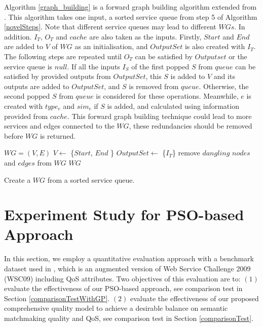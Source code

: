 Algorithm  \ref{graph_building} is a forward graph building algorithm extended from \cite{blum1997fast}. This algorithm takes one input, a sorted service queue from step 5 of Algorithm \ref{novelSteps}. Note that different service queues may lead to different $WGs$. In addition. $I_{T}$, $O_{T}$ and $cache$ are also taken as the inputs. Firstly, $Start$ and $End$ are added to $V$ of $WG$ as an initialisation, and $OutputSet$ is also created with $I_{T}$. The following steps are repeated until $O_{T}$ can be satisfied by $Outputset$ or the service queue is $null$. If all the inputs $I_{S}$ of the first popped  $S$ from $queue$ can be satisfied by provided outputs from $OutputSet$, this $S$ is added to $V$ and its outputs are added to $OutputSet$, and $S$ is removed from $queue$. Otherwise, the second popped  $S$ from $queue$ is considered for these operations. Meanwhile, $e$ is created with $type_e$ and $sim_e$ if $S$ is added, and calculated using information provided from $cache$. This forward graph building technique could lead to more services and edges connected to the $WG$, these redundancies should be removed before $WG$ is returned.

\begin{algorithm}
 \SetNlSty{}{}{:}
 $WG = (V, E)$\;
 $V \leftarrow$ \{$Start$, $End$ \}\;
 $OutputSet \leftarrow$ \{$I_{T}$\}\;
 remove $dangling$ $nodes$ and $edges$ from $WG$\; 
 \KwRet $WG$\;
 \caption{Create a $WG$ from a sorted service queue.}
\label{graph_building}
\end{algorithm} 

\section{Experiment Study for PSO-based Approach}\label{experiment_design}
In this section, we employ a quantitative evaluation approach with a benchmark dataset used in \cite{ma2015hybrid,da2016genetic}, which is an augmented version of Web Service Challenge 2009 (WSC09) including QoS attributes. Two objectives of this evaluation are to: $(1)$ evaluate the effectiveness of our PSO-based approach, see comparison test in Section \ref{comparisonTestWithGP}. $(2)$ evaluate the effectiveness of our proposed comprehensive quality model to achieve a desirable balance on semantic matchmaking quality and QoS, see comparison test in Section \ref{comparisonTest}.

